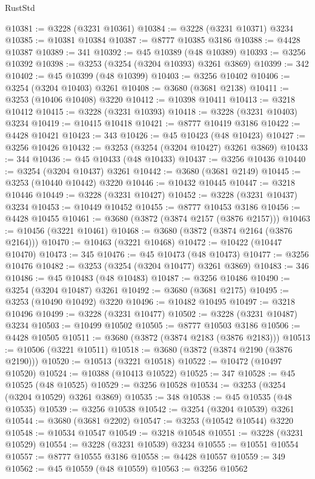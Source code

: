 \begin{lexlean}{RustStd}
\begin{coremodule}
@10381 := @3228 (@3231 @10361)
@10384 := @3228 (@3231 @10371) @3234
@10385 := @10381 @10384
@10387 := @8777 @10385 @3186
@10388 := @4428 @10387
@10389 := 341
@10392 := @45 @10389 (@48 @10389)
@10393 := @3256 @10392
@10398 := @3253 (@3254 (@3204 @10393) @3261 @3869)
@10399 := 342
@10402 := @45 @10399 (@48 @10399)
@10403 := @3256 @10402
@10406 := @3254 (@3204 @10403) @3261
@10408 := @3680 (@3681 @2138)
@10411 := @3253 (@10406 @10408) @3220
@10412 := @10398 @10411
@10413 := @3218 @10412
@10415 := @3228 (@3231 @10393)
@10418 := @3228 (@3231 @10403) @3234
@10419 := @10415 @10418
@10421 := @8777 @10419 @3186
@10422 := @4428 @10421
@10423 := 343
@10426 := @45 @10423 (@48 @10423)
@10427 := @3256 @10426
@10432 := @3253 (@3254 (@3204 @10427) @3261 @3869)
@10433 := 344
@10436 := @45 @10433 (@48 @10433)
@10437 := @3256 @10436
@10440 := @3254 (@3204 @10437) @3261
@10442 := @3680 (@3681 @2149)
@10445 := @3253 (@10440 @10442) @3220
@10446 := @10432 @10445
@10447 := @3218 @10446
@10449 := @3228 (@3231 @10427)
@10452 := @3228 (@3231 @10437) @3234
@10453 := @10449 @10452
@10455 := @8777 @10453 @3186
@10456 := @4428 @10455
@10461 := @3680 (@3872 (@3874 @2157 (@3876 @2157)))
@10463 := @10456 (@3221 @10461)
@10468 := @3680 (@3872 (@3874 @2164 (@3876 @2164)))
@10470 := @10463 (@3221 @10468)
@10472 := @10422 (@10447 @10470)
@10473 := 345
@10476 := @45 @10473 (@48 @10473)
@10477 := @3256 @10476
@10482 := @3253 (@3254 (@3204 @10477) @3261 @3869)
@10483 := 346
@10486 := @45 @10483 (@48 @10483)
@10487 := @3256 @10486
@10490 := @3254 (@3204 @10487) @3261
@10492 := @3680 (@3681 @2175)
@10495 := @3253 (@10490 @10492) @3220
@10496 := @10482 @10495
@10497 := @3218 @10496
@10499 := @3228 (@3231 @10477)
@10502 := @3228 (@3231 @10487) @3234
@10503 := @10499 @10502
@10505 := @8777 @10503 @3186
@10506 := @4428 @10505
@10511 := @3680 (@3872 (@3874 @2183 (@3876 @2183)))
@10513 := @10506 (@3221 @10511)
@10518 := @3680 (@3872 (@3874 @2190 (@3876 @2190)))
@10520 := @10513 (@3221 @10518)
@10522 := @10472 (@10497 @10520)
@10524 := @10388 (@10413 @10522)
@10525 := 347
@10528 := @45 @10525 (@48 @10525)
@10529 := @3256 @10528
@10534 := @3253 (@3254 (@3204 @10529) @3261 @3869)
@10535 := 348
@10538 := @45 @10535 (@48 @10535)
@10539 := @3256 @10538
@10542 := @3254 (@3204 @10539) @3261
@10544 := @3680 (@3681 @2202)
@10547 := @3253 (@10542 @10544) @3220
@10548 := @10534 @10547
@10549 := @3218 @10548
@10551 := @3228 (@3231 @10529)
@10554 := @3228 (@3231 @10539) @3234
@10555 := @10551 @10554
@10557 := @8777 @10555 @3186
@10558 := @4428 @10557
@10559 := 349
@10562 := @45 @10559 (@48 @10559)
@10563 := @3256 @10562

\end{coremodule}
\end{lexlean}
